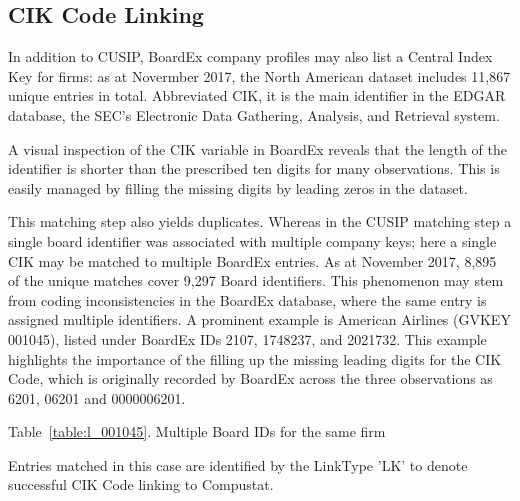 \documentclass[12pt]{article}
\begin{document}
\subsection{CIK Code Linking}\label{sec:CIKmatch}

In addition to CUSIP, BoardEx company profiles may also list a Central Index Key for firms: as at Novermber 2017, the North American dataset includes 11,867 unique entries in total.
Abbreviated CIK, it is the main identifier in the EDGAR database, the SEC's Electronic Data Gathering, Analysis, and Retrieval system.

A visual inspection of the CIK variable in BoardEx reveals that the length of the identifier is shorter than the prescribed ten digits for many observations.
This is easily managed by filling the missing digits by leading zeros in the dataset.

This matching step also yields duplicates.
Whereas in the CUSIP matching step a single board identifier was associated with multiple company keys; here a single CIK may be matched to multiple BoardEx entries.
As at November 2017, 8,895 of the unique matches cover 9,297 Board identifiers.
This phenomenon may stem from coding inconsistencies in the BoardEx database, where the same entry is assigned multiple identifiers.
A prominent example is American Airlines (GVKEY 001045), listed under BoardEx IDs 2107, 1748237, and 2021732.
This example highlights the importance of the filling up the missing leading digits for the CIK Code, which is originally recorded by BoardEx across the three observations as 6201, 06201 and 0000006201.

\begin{center}
Table~\ref{table:l_001045}. Multiple Board IDs for the same firm\label{table:l_001045}

\end{center}

Entries matched in this case are identified by the LinkType 'LK' to denote successful CIK Code linking to Compustat.

\begin{comment}
\subsection{Ticker Symbol Linking}\label{sec:TICmatch}

The third matching stage involves the same process as before and employs the original dataset for linking.
The company's ticker symbol is the third and last available identifier that can be matched between the BoardEx and Compustat databases.
As before, care is taken that ticker symbols are matched for the specific year, as it is customary for tickers to be reused and recycled over time.

Entries matched in this case are identified by the $Match\_TIC$ dummy to note successful identification.
The code includes methods to obtain summary statistics to inspect the success of a matching stage for each merging strategy.
\end{comment}
\end{document}
